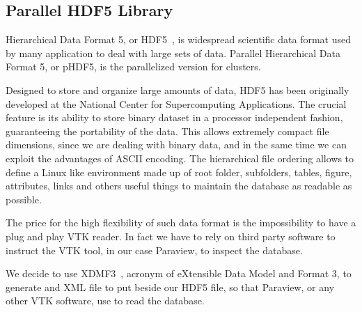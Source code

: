 \subsection{Parallel HDF5 Library}
Hierarchical Data Format 5, or HDF5~\cite{hdf5}, is widespread scientific data format used by many application to deal with large sets of data. Parallel Hierarchical Data Format 5, or pHDF5, is the parallelized version for clusters.\par
Designed to store and organize large amounts of data, HDF5 has been originally developed at the National Center for Supercomputing Applications. 
The crucial feature is its ability to store binary dataset in a processor independent fashion, guaranteeing the portability of the data. This allows extremely compact file dimensions, since we are dealing with binary data, and in the same time we can exploit the advantages of ASCII encoding.
The hierarchical file ordering allows to define a Linux like environment made up of root folder, subfolders, tables, figure, attributes, links and others useful things to maintain the database as readable as possible.\par
The price for the high flexibility of such data format is the impossibility to have a plug and play VTK reader. In fact we have to rely on third party software to instruct the VTK tool, in our case Paraview, to inspect the database. \par
We decide to use XDMF3~\cite{xdmf3}, acronym of eXtensible Data Model and Format 3, to generate and XML file to put beside our HDF5 file, so that Paraview, or any other VTK software, use to read the database.

